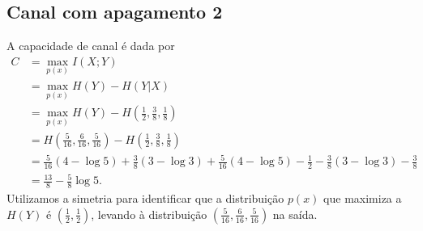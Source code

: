 \subsection{Canal com apagamento 2}

\begin{questions}

\begin{solution}

A capacidade de canal é dada por
\begin{align}
C &= \max_{p(x)} I(X;Y) \nonumber \\
  &= \max_{p(x)} H(Y) - H(Y|X) \nonumber \\
  &= \max_{p(x)} H(Y) - H\left( \frac{1}{2}, \frac{3}{8}, \frac{1}{8} \right) \nonumber \\
  &= H\left( \frac{5}{16}, \frac{6}{16}, \frac{5}{16} \right) - H\left( \frac{1}{2}, \frac{3}{8}, \frac{1}{8} \right) \nonumber \\
  &= \frac{5}{16} (4 - \log 5) + \frac{3}{8} (3 - \log 3) + \frac{5}{16} (4 - \log 5) - \frac{1}{2} - \frac{3}{8} (3 - \log 3) - \frac{3}{8} \nonumber \\
  &= \frac{13}{8} - \frac{5}{8} \log 5 .
\end{align}
Utilizamos a simetria para identificar que a distribuição $p(x)$ que maximiza a $H(Y)$ é $\left( \frac{1}{2}, \frac{1}{2} \right)$,
levando à distribuição $\left( \frac{5}{16}, \frac{6}{16}, \frac{5}{16} \right) $ na saída.


\end{solution}
\end{questions}
